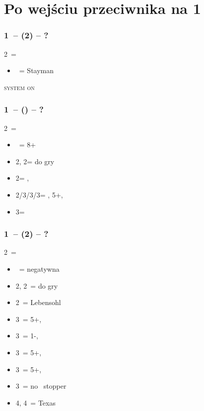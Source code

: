 \documentclass[12pt, a4paper]{report}
\begin{document}
\section*{\colorbox{blue!30}{Po wejściu przeciwnika na 1\ntx}}
 {

    \subsubsection*{1\ntx\ -- (2\clubs) -- ?}
    2\clubs\ = \clubs
    \begin{itemize}
        \item \dbl\ = Stayman
    \end{itemize}

    \textsc{system on}

    \subsubsection*{1\ntx\ -- (\alrts{2\clubs}) -- ?}
    2\clubs\ = \major
    \begin{itemize}
        \item \dbl\ = 8+
        \item 2\diams, 2\hearts = do gry
        \item 2\spades = \minor, \invp
        \item 2\nt/3\clubs/3\diams/3\hearts = \trsf{\clubs/\diams/\hearts/\spades}, 5+, \invp
        \item 3\spades = \gf
    \end{itemize}

    \subsubsection*{1\ntx\ -- (2\diams) -- ?}
    2\diams\ = \diams
    \begin{itemize}
        \item \dbl\ = negatywna
        \item 2\hearts, 2\spades\ = do gry
        \item 2\nt\ = Lebensohl
        \item 3\clubs\ = 5+\hearts, \invp
        \item 3\diams\ = 1-\diams, \invp
        \item 3\hearts\ = 5+\spades, \invp
        \item 3\spades\ = 5+\clubs, \invp
        \item 3\nt\ = no \diams\ stopper
        \item 4\diams, 4\hearts\ = Texas
    \end{itemize}

}
\end{document}
